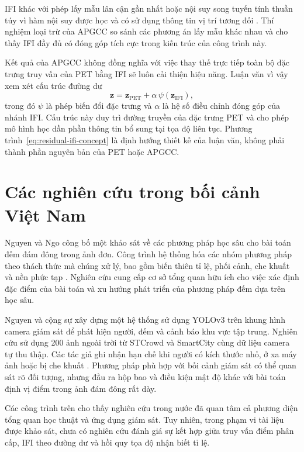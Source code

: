 IFI khác với phép lấy mẫu lân cận gần nhất hoặc nội suy song tuyến tính thuần túy vì hàm nội suy được học và có sử dụng thông tin vị trí tương đối \cite{chen2024apgcc}. Thí nghiệm loại trừ của APGCC so sánh các phương án lấy mẫu khác nhau và cho thấy IFI đầy đủ có đóng góp tích cực trong kiến trúc của công trình này.

Kết quả của APGCC không đồng nghĩa với việc thay thế trực tiếp toàn bộ đặc trưng truy vấn của PET bằng IFI sẽ luôn cải thiện hiệu năng. Luận văn vì vậy xem xét cấu trúc đường dư
\begin{equation}
    \mathbf z
    =\mathbf z_{\mathrm{PET}}
     +\alpha\,\psi(\mathbf z_{\mathrm{IFI}}),
    \label{eq:residual-ifi-concept}
\end{equation}
trong đó $\psi$ là phép biến đổi đặc trưng và $\alpha$ là hệ số điều chỉnh đóng góp của nhánh IFI. Cấu trúc này duy trì đường truyền của đặc trưng PET và cho phép mô hình học dần phần thông tin bổ sung tại tọa độ liên tục. Phương trình~\eqref{eq:residual-ifi-concept} là định hướng thiết kế của luận văn, không phải thành phần nguyên bản của PET hoặc APGCC.

\section{Các nghiên cứu trong bối cảnh Việt Nam}

Nguyen và Ngo công bố một khảo sát về các phương pháp học sâu cho bài toán đếm đám đông trong ảnh đơn. Công trình hệ thống hóa các nhóm phương pháp theo thách thức mà chúng xử lý, bao gồm biến thiên tỉ lệ, phối cảnh, che khuất và nền phức tạp \cite{nguyen2020survey}. Nghiên cứu cung cấp cơ sở tổng quan hữu ích cho việc xác định đặc điểm của bài toán và xu hướng phát triển của phương pháp đếm dựa trên học sâu.

Nguyen và cộng sự xây dựng một hệ thống sử dụng YOLOv3 trên khung hình camera giám sát để phát hiện người, đếm và cảnh báo khu vực tập trung. Nghiên cứu sử dụng 200 ảnh ngoài trời từ STCrowd và SmartCity cùng dữ liệu camera tự thu thập. Các tác giả ghi nhận hạn chế khi người có kích thước nhỏ, ở xa máy ảnh hoặc bị che khuất \cite{nguyen2023yolocrowd}. Phương pháp phù hợp với bối cảnh giám sát có thể quan sát rõ đối tượng, nhưng đầu ra hộp bao và điều kiện mật độ khác với bài toán định vị điểm trong ảnh đám đông rất dày.

Các công trình trên cho thấy nghiên cứu trong nước đã quan tâm cả phương diện tổng quan học thuật và ứng dụng giám sát. Tuy nhiên, trong phạm vi tài liệu được khảo sát, chưa có nghiên cứu đánh giá sự kết hợp giữa truy vấn điểm phân cấp, IFI theo đường dư và hồi quy tọa độ nhận biết tỉ lệ.

